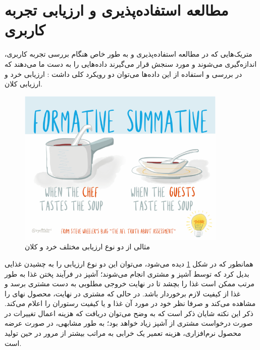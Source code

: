 \section{مطالعه استفاده‌پذیری و ارزیابی تجربه کاربری}
متریک‌هایی که در مطالعه استفاده‌پذیری و به طور خاص هنگام بررسی تجربه کاربری، اندازه‌گیری می‌شوند و مورد سنجش قرار می‌گیرند داده‌هایی را به دست ما می‌دهند که در بررسی و استفاده از این داده‌ها می‌توان دو رویکرد کلی داشت
\cite{albert_measuring_2013}:
ارزیابی خرد و ارزیابی کلان.\\
\begin{figure}
	\centering\includegraphics[width=10cm]{Resources/assessment.PNG}
	\caption{مثالی از دو نوع ارزیابی مختلف خرد و کلان
		\cite{noauthor_formative_nodate}
	}
	\label{fig:assessment}
\end{figure}
همانطور که در شکل
\ref{fig:assessment}
دیده می‌شود، می‌توان این دو نوع ارزیابی را به  چشیدن غذایی بدیل کرد که توسط آشپز و مشتری انجام می‌شوند؛ آشپز در فرآیند پختن غذا به طور مرتب ممکن است غذا را بچشد تا در نهایت خروجی مطلوبی به دست مشتری برسد و غذا از کیفیت لازم برخوردار باشد. در حالی که مشتری در نهایت، محصول نهای را مشاهده می‌کند و صرفا نظر خود در مورد آن غذا و یا کیفیت رستوران را اعلام می‌کند. ذکر این نکته شایان ذکر است که به وضح می‌توان دریافت که هزینه اعمال تغییرات در صورت درخواست مشتری از آشپز زیاد خواهد بود؛ به طور مشابهی، در صورت عرضه محصول نرم‌افزاری، هزینه تعمیر یک خرابی به مراتب بیشتر از مرور در حین تولید است.
